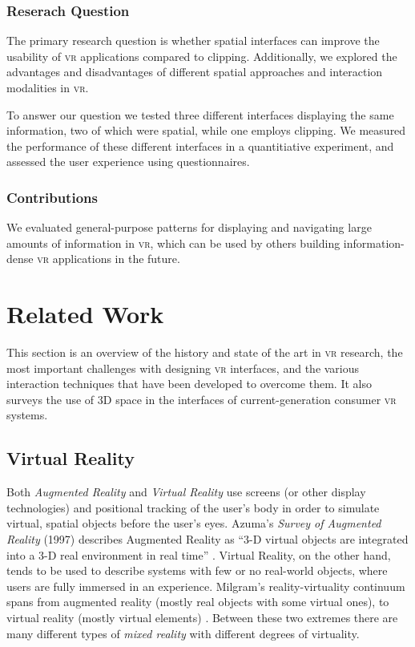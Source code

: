 \documentclass[nobib]{tufte-book} %
\begin{document}
\subsection{Reserach Question}
The primary research question is whether spatial interfaces can improve the usability of \textsc{vr} applications compared to clipping. Additionally, we explored the advantages and disadvantages of different spatial approaches and interaction modalities in \textsc{vr}.

To answer our question we tested three different interfaces displaying the same information, two of which were spatial, while one employs clipping. We measured the performance of these different interfaces in a quantitiative experiment, and assessed the user experience using questionnaires.

\subsection{Contributions}
We evaluated general-purpose patterns for displaying and navigating large amounts of information in \textsc{vr}, which can be used by others building information-dense \textsc{vr} applications in the future.


\chapter{Related Work}
\label{ch:related-work}

This section is an overview of the history and state of the art in \textsc{vr} research, the most important challenges with designing \textsc{vr} interfaces, and the various interaction techniques that have been developed to overcome them. It also surveys the use of 3D space in the interfaces of current-generation consumer \textsc{vr} systems.

\section{Virtual Reality}
Both \emph{Augmented Reality} and \emph{Virtual Reality} use screens (or other display technologies) and positional tracking of the user's body in order to simulate virtual, spatial objects before the user's eyes. Azuma's \emph{Survey of Augmented Reality} (1997) describes Augmented Reality as ``3-D virtual objects are integrated into a 3-D real environment in real time'' \cite{azuma1997survey}. Virtual Reality, on the other hand, tends to be used to describe systems with few or no real-world objects, where users are fully immersed in an experience.
Milgram's reality-virtuality continuum spans from augmented reality (mostly real objects with some virtual ones), to virtual reality (mostly virtual elements) \cite{milgram1994taxonomy}. Between these two extremes there are many different types of \emph{mixed reality} with different degrees of virtuality.
\end{document}
